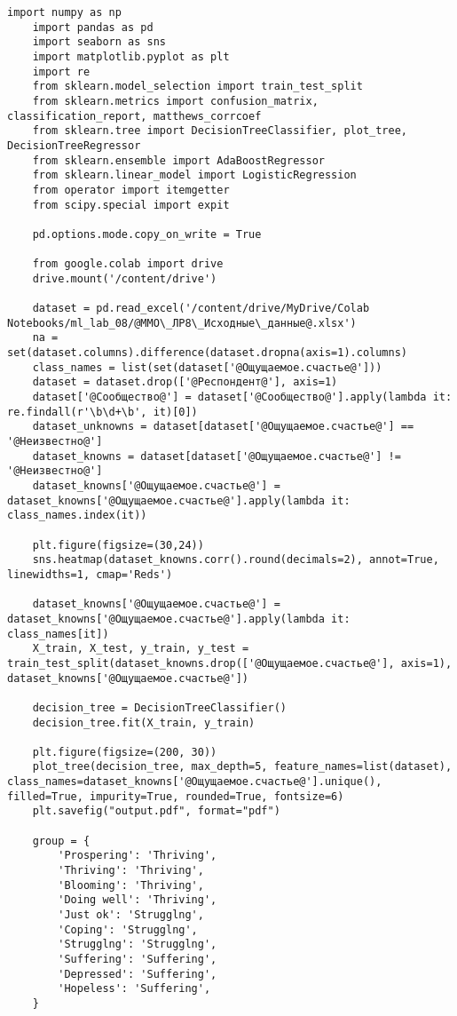 \begin{lstlisting}[label=lst:1,caption=Классификация с использованием дерева решений\, логистической регрессии и ансамблевого классификатора]
	import numpy as np
	import pandas as pd
	import seaborn as sns
	import matplotlib.pyplot as plt
	import re
	from sklearn.model_selection import train_test_split
	from sklearn.metrics import confusion_matrix, classification_report, matthews_corrcoef
	from sklearn.tree import DecisionTreeClassifier, plot_tree, DecisionTreeRegressor
	from sklearn.ensemble import AdaBoostRegressor
	from sklearn.linear_model import LogisticRegression
	from operator import itemgetter
	from scipy.special import expit
	
	pd.options.mode.copy_on_write = True
	
	from google.colab import drive
	drive.mount('/content/drive')
	
	dataset = pd.read_excel('/content/drive/MyDrive/Colab Notebooks/ml_lab_08/@ММО\_ЛР8\_Исходные\_данные@.xlsx')
	na = set(dataset.columns).difference(dataset.dropna(axis=1).columns)
	class_names = list(set(dataset['@Ощущаемое.счастье@']))
	dataset = dataset.drop(['@Респондент@'], axis=1)
	dataset['@Сообщество@'] = dataset['@Сообщество@'].apply(lambda it: re.findall(r'\b\d+\b', it)[0])
	dataset_unknowns = dataset[dataset['@Ощущаемое.счастье@'] == '@Неизвестно@']
	dataset_knowns = dataset[dataset['@Ощущаемое.счастье@'] != '@Неизвестно@']
	dataset_knowns['@Ощущаемое.счастье@'] = dataset_knowns['@Ощущаемое.счастье@'].apply(lambda it: class_names.index(it))
	
	plt.figure(figsize=(30,24))
	sns.heatmap(dataset_knowns.corr().round(decimals=2), annot=True, linewidths=1, cmap='Reds')
	
	dataset_knowns['@Ощущаемое.счастье@'] = dataset_knowns['@Ощущаемое.счастье@'].apply(lambda it: class_names[it])
	X_train, X_test, y_train, y_test = train_test_split(dataset_knowns.drop(['@Ощущаемое.счастье@'], axis=1), dataset_knowns['@Ощущаемое.счастье@'])
	
	decision_tree = DecisionTreeClassifier()
	decision_tree.fit(X_train, y_train)
	
	plt.figure(figsize=(200, 30))
	plot_tree(decision_tree, max_depth=5, feature_names=list(dataset), class_names=dataset_knowns['@Ощущаемое.счастье@'].unique(), filled=True, impurity=True, rounded=True, fontsize=6)
	plt.savefig("output.pdf", format="pdf")
	
	group = {
		'Prospering': 'Thriving',
		'Thriving': 'Thriving',
		'Blooming': 'Thriving',
		'Doing well': 'Thriving',
		'Just ok': 'Strugglng',
		'Coping': 'Strugglng',
		'Strugglng': 'Strugglng',
		'Suffering': 'Suffering',
		'Depressed': 'Suffering',
		'Hopeless': 'Suffering',
	}
	

\end{lstlisting}
